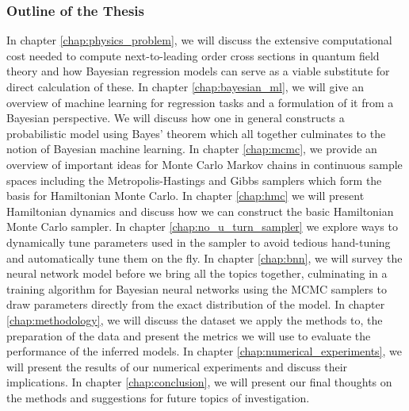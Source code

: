 \subsubsection*{Outline of the Thesis}
In chapter \ref{chap:physics_problem}, we will discuss the extensive computational cost needed to compute next-to-leading order cross sections in quantum field theory and how Bayesian regression models can serve as a viable substitute for direct calculation of these. 
In chapter \ref{chap:bayesian_ml}, we will give an overview of machine learning for regression tasks and a formulation of it from a Bayesian perspective. We will discuss how one in general constructs a probabilistic model using Bayes' theorem which all together culminates to the notion of Bayesian machine learning.
In chapter \ref{chap:mcmc}, we provide an overview of important ideas for Monte Carlo Markov chains in continuous sample spaces including the Metropolis-Hastings and Gibbs samplers which form the basis for Hamiltonian Monte Carlo. In chapter \ref{chap:hmc} we will present Hamiltonian dynamics and discuss how we can construct the basic Hamiltonian Monte Carlo sampler. 
In chapter \ref{chap:no_u_turn_sampler} we explore ways to dynamically tune parameters used in the sampler to avoid tedious hand-tuning and automatically tune them on the fly. In chapter \ref{chap:bnn}, we will survey the neural network model before we bring all the topics together, culminating in a training algorithm for Bayesian neural networks using the MCMC samplers to draw parameters directly from the exact distribution of the model. In chapter \ref{chap:methodology}, we will discuss the dataset we apply the methods to, the preparation of the data and present the metrics we will use to evaluate the performance of the inferred models. In chapter \ref{chap:numerical_experiments}, we will present the results of our numerical experiments and discuss their implications. In chapter \ref{chap:conclusion}, we will present our final thoughts on the methods and suggestions for future topics of investigation.


\begin{comment}
    The two most common classes are weight-space symmetry and scaling symmetry. The first symmetry refers to the case where two layers can be permuted and still produce the same prediction. The second symmetry arise when using non-linear function that obey $\sigma(\alpha x) = \alpha\sigma(x)$. The second symmetry can be removed entirely by avoidance of non-linear function of this form but the first symmetry is an unavoidable one. Thus many equivalent parameterizations exist which manifest itself as a multi-modal distribution that can be notoriously difficult to infer parameters from.
\end{comment}
